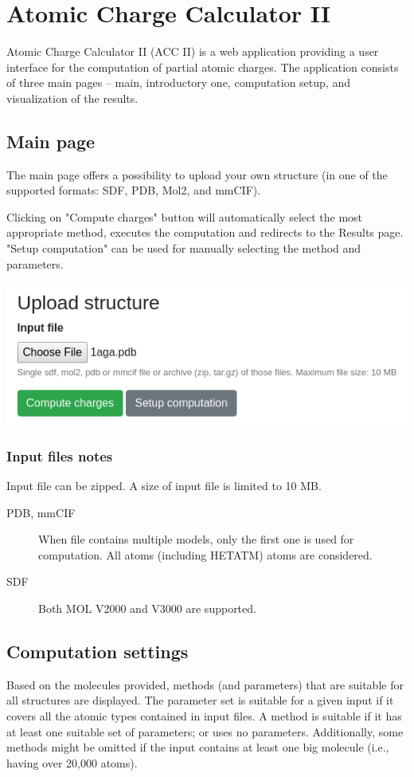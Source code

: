 \documentclass[oneside]{memoir}
\begin{document}
\chapter*{Atomic Charge Calculator \textcolor{ACCgreen}{II}}
Atomic Charge Calculator II (ACC II) is a web application providing a user interface for the computation of partial atomic charges. The application consists of three main pages – main, introductory one, computation setup, and visualization of the results.

\section*{Main page}
The main page offers a possibility to upload your own structure (in one of the supported formats: SDF, PDB, Mol2, and mmCIF).

Clicking on "Compute charges" button will automatically select the most appropriate method, executes the computation and redirects to the Results page. "Setup computation" can be used for manually selecting the method and parameters.

\begin{center}
    \includegraphics[width=.5\linewidth]{images/upload.png}
\end{center}

\subsection*{Input files notes}
Input file can be zipped. A size of input file is limited to 10 MB.
\begin{description}
\item[PDB, mmCIF] When file contains multiple models, only the first one is used for computation. All atoms (including HETATM) atoms are considered.
\item[SDF] Both MOL V2000 and V3000 are supported.
\end{description}

\section*{Computation settings}
Based on the molecules provided, methods (and parameters) that are suitable for all structures are displayed. The parameter set is suitable for a given input if it covers all the atomic types contained in input files. A method is suitable if it has at least one suitable set of parameters; or uses no parameters. Additionally, some methods might be omitted if the input contains at least one big molecule (i.e., having over 20,000 atoms).
\end{document}
